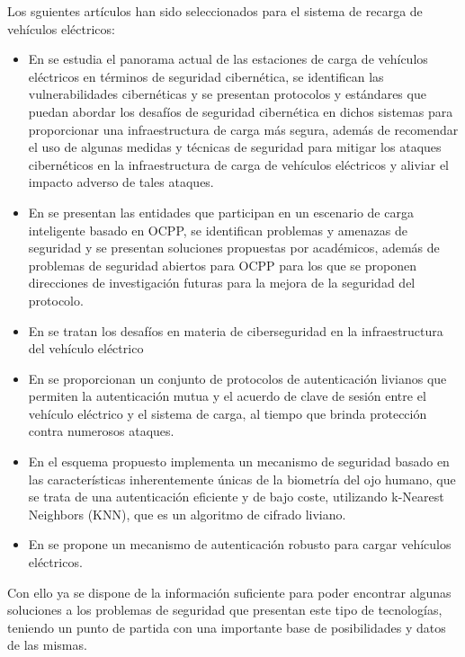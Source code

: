 \documentclass[12pt,a4paper,onecolumn,oneside]{report}
\begin{document}
Los sguientes artículos han sido seleccionados para el sistema de recarga de vehículos eléctricos:
\begin{itemize}
\item En \cite{eanueve} se estudia el panorama actual de las estaciones de carga de vehículos eléctricos en términos de seguridad cibernética, se identifican las vulnerabilidades cibernéticas y se presentan protocolos y estándares que puedan abordar los desafíos de seguridad cibernética en dichos sistemas para proporcionar una infraestructura de carga más segura, además de recomendar el uso de algunas medidas y técnicas de seguridad para mitigar los ataques cibernéticos en la infraestructura de carga de vehículos eléctricos y aliviar el impacto adverso de tales ataques.
\item En \cite{eadiez} se presentan las entidades que participan en un escenario de carga inteligente basado en OCPP, se identifican problemas y amenazas de seguridad y se presentan soluciones propuestas por académicos, además de problemas de seguridad abiertos para OCPP para los que se proponen direcciones de investigación futuras para la mejora de la seguridad del protocolo.
\item En \cite{eaonce} se tratan los desafíos en materia de ciberseguridad en la infraestructura del vehículo eléctrico
\item En \cite{eadoce} se proporcionan un conjunto de protocolos de autenticación livianos que permiten la autenticación mutua y el acuerdo de clave de sesión entre el vehículo eléctrico y el sistema de carga, al tiempo que brinda protección contra numerosos ataques.
\item En \cite{eatrece} el esquema propuesto implementa un mecanismo de seguridad basado en las características inherentemente únicas de la biometría del ojo humano, que se trata de una autenticación eficiente y de bajo coste, utilizando k-Nearest Neighbors (KNN), que es un algoritmo de cifrado liviano.
\item En \cite{eacatorce} se propone un mecanismo de autenticación robusto para cargar vehículos eléctricos.

\end{itemize}

Con ello ya se dispone de la información suficiente para poder encontrar algunas soluciones a los problemas de seguridad que presentan este tipo de tecnologías, teniendo un punto de partida con una importante base de posibilidades y datos de las mismas.
\end{document}
